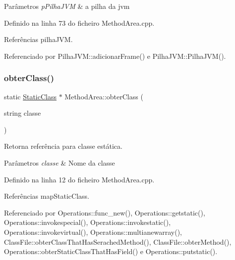 \begin{DoxyParams}{Parâmetros}
{\em p\+Pilha\+J\+VM} & a pilha da jvm \\
\hline
\end{DoxyParams}


Definido na linha 73 do ficheiro Method\+Area.\+cpp.



Referências pilha\+J\+VM.



Referenciado por Pilha\+J\+V\+M\+::adicionar\+Frame() e Pilha\+J\+V\+M\+::\+Pilha\+J\+V\+M().

\mbox{\label{classMethodArea_a6e9d922892887daadd4624729268094f}} 
\subsubsection{\texorpdfstring{obter\+Class()}{obterClass()}}
{\footnotesize\ttfamily static \hyperlink{classStaticClass}{Static\+Class} $\ast$ Method\+Area\+::obter\+Class (\begin{DoxyParamCaption}\item[{string}]{classe }\end{DoxyParamCaption})\hspace{0.3cm}{\ttfamily [static]}}



Retorna referência para classe estática. 


\begin{DoxyParams}{Parâmetros}
{\em classe} & Nome da classe \\
\hline
\end{DoxyParams}


Definido na linha 12 do ficheiro Method\+Area.\+cpp.



Referências map\+Static\+Class.



Referenciado por Operations\+::func\+\_\+new(), Operations\+::getstatic(), Operations\+::invokespecial(), Operations\+::invokestatic(), Operations\+::invokevirtual(), Operations\+::multianewarray(), Class\+File\+::obter\+Class\+That\+Has\+Serached\+Method(), Class\+File\+::obter\+Method(), Operations\+::obter\+Static\+Class\+That\+Has\+Field() e Operations\+::putstatic().



